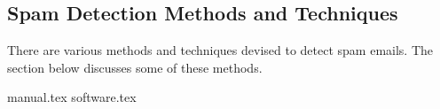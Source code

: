 \subsection{Spam Detection Methods and Techniques}
There are various methods and techniques devised to detect spam emails. The section below discusses some of these methods.

{manual.tex}
{software.tex}